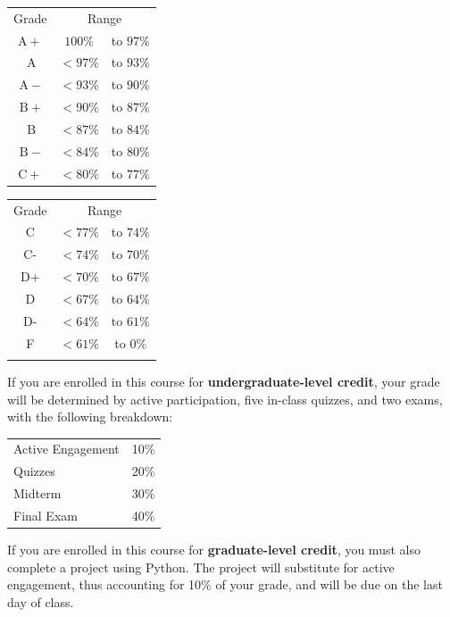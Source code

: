 \documentclass{./../Latex/syllabus}
\begin{document}
\begin{center}
\begin{minipage}[t]{0.75\textwidth}
\begin{tabular}{|ccc|}
\hline
Grade & \multicolumn{2}{c|}{Range} \\
$\mathrm{A}+$ & $100 \%$ & to $97 \%$ \\
$\mathrm{~A}$ & $<97 \%$ & to $93 \%$ \\
$\mathrm{~A}-$ & $<93 \%$ & to $90 \%$ \\
$\mathrm{~B}+$ & $<90 \%$ & to $87 \%$ \\
$\mathrm{~B}$ & $<87 \%$ & to $84 \%$ \\
$\mathrm{~B}-$ & $<84 \%$ & to $80 \%$ \\
$\mathrm{C}+$ & $<80 \%$ & to $77 \%$ \\
\hline
\end{tabular} \hspace{2cm}
\begin{tabular}{|ccc|}
\hline
Grade & \multicolumn{2}{c|}{Range} \\
C & $<77 \%$ & to $74 \%$ \\
C- & $<74 \%$ & to $70 \%$ \\
D+ & $<70 \%$ & to $67 \%$ \\
D & $<67 \%$ & to $64 \%$ \\
D- & $<64 \%$ & to $61 \%$ \\
F & $<61 \%$ & to $0 \%$ \\
 &  &  \\
\hline
\end{tabular}
\end{minipage}
\end{center} 
\vspace{1em}

\noindent If you are enrolled in this course for \textbf{undergraduate-level credit}, your grade will be determined by active participation, five in-class quizzes, and two exams, with the following breakdown:
\begin{center}
\begin{tabularx}{0.35\textwidth}{Xr}
Active Engagement & 10\% \\
Quizzes & 20\% \\
Midterm & 30\% \\
Final Exam & 40\% \\
\end{tabularx}
\end{center}

\noindent If you are enrolled in this course for \textbf{graduate-level credit}, you must also complete a project using Python. The project will substitute for active engagement, thus accounting for 10\% of your grade, and will be due on the last day of class. %
\end{document}
